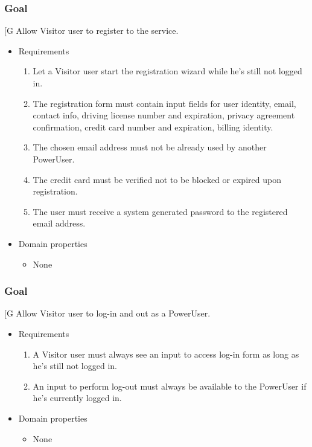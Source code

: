     \subsubsection{Goal }
    {[}G\arabic{goalctr}{]}
    Allow Visitor user to register to the service.
    \begin{itemize}
        \item Requirements
        \begin{enumerate}[REQ]
    		    \item Let a Visitor user start the registration wizard while he's still not logged in.
			    \item The registration form must contain input fields for user identity, email, contact info, driving license number and expiration, privacy agreement confirmation, credit card number and expiration, billing identity.
			    \item The chosen email address must not be already used by another PowerUser.
			    \item The credit card must be verified not to be blocked or expired upon registration.
			    \item The user must receive a system generated password to the registered email address.
        \end{enumerate}
        \item Domain properties
        \begin{itemize}
    			\item None
        \end{itemize}
    \end{itemize}

    \subsubsection{Goal }
    {[}G\arabic{goalctr}{]}
    Allow Visitor user to log-in and out as a PowerUser.
    \begin{itemize}
        \item Requirements
        \begin{enumerate}[REQ]
			    \item A Visitor user must always see an input to access log-in form as long as he's still not logged in.
		        \item An input to perform log-out must always be available to the PowerUser if he's currently logged in.
        \end{enumerate}
        \item Domain properties
        \begin{itemize}
    			\item None
        \end{itemize}
    \end{itemize}

